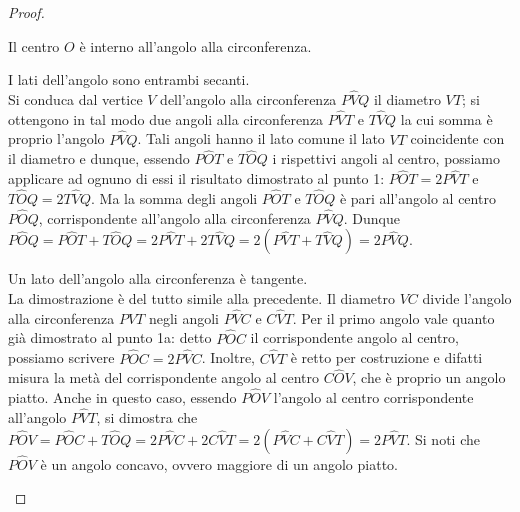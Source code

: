 \begin{proof}
\begin{enumerate*}
\item Il centro $O$ è interno all'angolo alla circonferenza.
\begin{enumerate*}
\noindent\begin{minipage}{0.6\textwidth}\parindent15pt
\item I lati dell'angolo sono entrambi secanti.\\
Si conduca dal vertice $V$ dell'angolo alla circonferenza 
$P\widehat{V}Q$ il diametro $VT$; si ottengono in tal modo due angoli 
alla circonferenza $P\widehat{V}T$ e $T\widehat{V}Q$ la cui somma è 
proprio l'angolo $P\widehat{V}Q$. Tali angoli hanno il lato comune il 
lato $VT$ coincidente con il diametro e dunque, essendo 
$P\widehat{O}T$ e $T\widehat{O}Q$ i rispettivi angoli al centro, 
possiamo applicare ad ognuno di essi il risultato dimostrato al punto 
1: $P\widehat{O}T=2P\widehat{V}T$ e $T\widehat{O}Q=2T\widehat{V}Q$.
Ma la somma degli angoli $P\widehat{O}T$ e $T\widehat{O}Q$ è pari 
all'angolo al centro $P\widehat{O}Q$, corrispondente all'angolo alla 
circonferenza $P\widehat{V}Q$.
Dunque 
$P\widehat{O}Q=P\widehat{O}T+T\widehat{O}Q=2P\widehat{V}T+2T\widehat{V
} Q=2(P\widehat{V}T+T\widehat{V}Q)=2P\widehat{V}Q$.
\end{minipage}\hfil
\noindent\hspace{-20pt}\begin{minipage}{0.4\textwidth}
  \centering
\end{minipage}
\noindent\begin{minipage}{0.6\textwidth}\parindent15pt
\item Un lato dell'angolo alla circonferenza è tangente.\\
La dimostrazione è del tutto simile alla precedente. Il diametro $VC$ 
divide l'angolo alla circonferenza $P\widehat{V}T$ negli angoli 
$P\widehat{V}C$ e $C\widehat{V}T$. Per il primo angolo vale quanto 
già dimostrato al punto 1a: detto 
$P\widehat{O}C$ il corrispondente angolo al centro, possiamo scrivere 
$P\widehat{O}C=2P\widehat{V}C$. Inoltre, $C\widehat{V}T$ è retto per 
costruzione e difatti misura la metà del corrispondente angolo al 
centro $C\widehat{O}V$, che è proprio un angolo piatto. 
Anche in questo caso, essendo 
$P\widehat{O}V$ l'angolo al centro corrispondente all'angolo 
$P\widehat{V}T$, si dimostra che 
$P\widehat{O}V=P\widehat{O}C+T\widehat{O}Q=2P\widehat{V}C+2C\widehat{V
} T=2(P\widehat{V}C+C\widehat{V}T)=2P\widehat{V}T$.
Si noti che $P\widehat{O}V$ è un angolo concavo, ovvero maggiore di 
un angolo piatto.
\end{minipage}\hfil
\noindent\hspace{-20pt}\begin{minipage}{0.4\textwidth}
  \centering
\end{minipage}
\end{enumerate*}


\end{enumerate*}
\end{proof}
